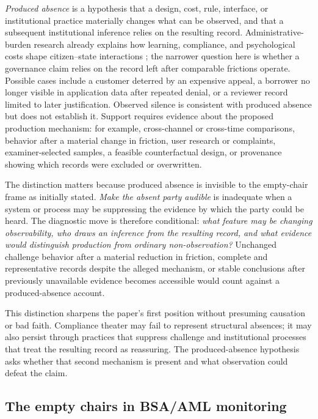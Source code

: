 \emph{Produced absence} is a hypothesis that a design, cost, rule, interface, or institutional practice materially changes what can be observed, and that a subsequent institutional inference relies on the resulting record. Administrative-burden research already explains how learning, compliance, and psychological costs shape citizen--state interactions \parencite{moynihan2015}; the narrower question here is whether a governance claim relies on the record left after comparable frictions operate. Possible cases include a customer deterred by an expensive appeal, a borrower no longer visible in application data after repeated denial, or a reviewer record limited to later justification. Observed silence is consistent with produced absence but does not establish it. Support requires evidence about the proposed production mechanism: for example, cross-channel or cross-time comparisons, behavior after a material change in friction, user research or complaints, examiner-selected samples, a feasible counterfactual design, or provenance showing which records were excluded or overwritten.

The distinction matters because produced absence is invisible to the empty-chair frame as initially stated. \emph{Make the absent party audible} is inadequate when a system or process may be suppressing the evidence by which the party could be heard. The diagnostic move is therefore conditional: \emph{what feature may be changing observability, who draws an inference from the resulting record, and what evidence would distinguish production from ordinary non-observation?} Unchanged challenge behavior after a material reduction in friction, complete and representative records despite the alleged mechanism, or stable conclusions after previously unavailable evidence becomes accessible would count against a produced-absence account.

This distinction sharpens the paper's first position without presuming causation or bad faith. Compliance theater may fail to represent structural absences; it may also persist through practices that suppress challenge and institutional processes that treat the resulting record as reassuring. The produced-absence hypothesis asks whether that second mechanism is present and what observation could defeat the claim.

\subsection{The empty chairs in BSA/AML monitoring}
\label{sec:frame-as-method:bsa-aml-empty-chairs}

